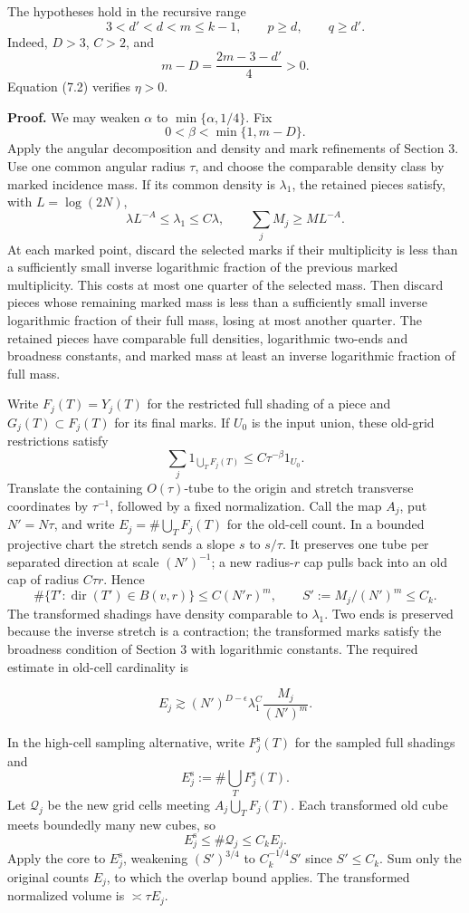 \documentclass[
  11pt,
  a4paper,
]{article}
\begin{document}
The hypotheses hold in the recursive range \[
 3<d'<d<m\le k-1,\qquad p\ge d,\qquad q\ge d'.
\] Indeed, \(D>3\), \(C>2\), and \[
 m-D=\frac{2m-3-d'}4>0.
\] Equation (7.2) verifies \(\eta>0\).

\textbf{Proof.} We may weaken \(\alpha\) to \(\min\{\alpha,1/4\}\). Fix
\[
 0<\beta<\min\{1,m-D\}.
\] Apply the angular decomposition and density and mark refinements of
Section 3. Use one common angular radius \(\tau\), and choose the
comparable density class by marked incidence mass. If its common density
is \(\lambda_1\), the retained pieces satisfy, with \(L=\log(2N)\), \[
 \lambda L^{-A}\le\lambda_1\le C\lambda,
 \qquad \sum_jM_j\ge ML^{-A}.
\] At each marked point, discard the selected marks if their
multiplicity is less than a sufficiently small inverse logarithmic
fraction of the previous marked multiplicity. This costs at most one
quarter of the selected mass. Then discard pieces whose remaining marked
mass is less than a sufficiently small inverse logarithmic fraction of
their full mass, losing at most another quarter. The retained pieces
have comparable full densities, logarithmic two-ends and broadness
constants, and marked mass at least an inverse logarithmic fraction of
full mass.

Write \(F_j(T)=Y_j(T)\) for the restricted full shading of a piece and
\(G_j(T)\subset F_j(T)\) for its final marks. If \(U_0\) is the input
union, these old-grid restrictions satisfy \[
 \sum_j1_{\bigcup_TF_j(T)}\le C\tau^{-\beta}1_{U_0}.
\] Translate the containing \(O(\tau)\)-tube to the origin and stretch
transverse coordinates by \(\tau^{-1}\), followed by a fixed
normalization. Call the map \(A_j\), put \(N'=N\tau\), and write
\(E_j=\#\bigcup_TF_j(T)\) for the old-cell count. In a bounded
projective chart the stretch sends a slope \(s\) to \(s/\tau\). It
preserves one tube per separated direction at scale \((N')^{-1}\); a new
radius-\(r\) cap pulls back into an old cap of radius \(C\tau r\). Hence
\[
 \#\{T':\operatorname{dir}(T')\in B(v,r)\}
 \le C(N'r)^m,\qquad
 S':=M_j/(N')^m\le C_k.
\] The transformed shadings have density comparable to \(\lambda_1\).
Two ends is preserved because the inverse stretch is a contraction; the
transformed marks satisfy the broadness condition of Section 3 with
logarithmic constants. The required estimate in old-cell cardinality is

\[
E_j\gtrsim (N')^{D-\epsilon}\lambda_1^C
\frac{M_j}{(N')^m}.                                   \tag{7.1}\label{eq:7.1}
\]

In the high-cell sampling alternative, write \(F_j^{\mathrm s}(T)\) for
the sampled full shadings and \[
 E_j^{\mathrm s}:=\#\bigcup_TF_j^{\mathrm s}(T).
\] Let \(\mathcal Q_j\) be the new grid cells meeting
\(A_j\bigcup_TF_j(T)\). Each transformed old cube meets boundedly many
new cubes, so \[
 E_j^{\mathrm s}\le\#\mathcal Q_j\le C_kE_j.
\] Apply the core to \(E_j^{\mathrm s}\), weakening \((S')^{3/4}\) to
\(C_k^{-1/4}S'\) since \(S'\le C_k\). Sum only the original counts
\(E_j\), to which the overlap bound applies. The transformed normalized
volume is \(\asymp\tau E_j\).
\end{document}
